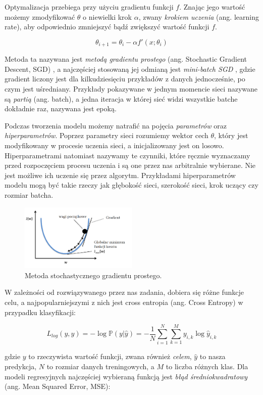 \documentclass[licencjacka]{pracamgr}
\begin{document}
Optymalizacja przebiega przy użyciu gradientu funkcji $ f $. Znając jego wartość możemy zmodyfikować $\theta$ o niewielki krok $ \alpha $, zwany \emph{krokiem uczenia} (ang. learning rate), aby odpowiednio zmniejszyć bądź zwiększyć wartość funkcji $ f $. 

$$ \theta_{i+1} = \theta_i - \alpha f'(x; \theta_i) $$

Metoda ta nazywana jest \emph{metodą gradientu prostego} (ang. Stochastic Gradient Descent, SGD) \cite{sgd}, a najczęściej stosowaną jej odmianą jest \emph{mini-batch SGD} \cite{mini-batch-sgd}, gdzie gradient liczony jest dla kilkudziesięciu przykładów z danych jednocześnie, po czym jest uśredniany. Przykłady pokazywane w jednym momencie sieci nazywane są \emph{partią} (ang. batch), a jedna iteracja w której sieć widzi wszystkie batche dokładnie raz, nazywana jest epoką.

Podczas tworzenia modelu możemy natrafić na pojęcia \emph{parametrów} oraz \emph{hiperparametrów}. Poprzez parametry sieci rozumiemy wektor cech $\theta$, który jest modyfikowany w procesie uczenia sieci, a inicjalizowany jest on losowo. Hiperparametrami natomiast nazywamy te czynniki, które ręcznie wyznaczamy przed rozpoczęciem procesu uczenia i są one przez nas arbitralnie wybierane. Nie jest możliwe ich uczenie się przez algorytm. Przykładami hiperparametrów modelu mogą być takie rzeczy jak głębokość sieci, szerokość sieci, krok uczący czy rozmiar batcha.

\begin{figure}[ht]
  \centering
  \includegraphics[width=0.5\textwidth]{sgd}
  \caption{Metoda stochastycznego gradientu prostego. \cite{sgd-img}}
\end{figure}

W zależności od rozwiązywanego przez nas zadania, dobiera się różne funkcje celu, a najpopularniejszymi z nich jest cross entropia (ang. Cross Entropy) w przypadku klasyfikacji:

$$ L_{log}(y, \hat{y}) = -\log\mathbb{P}(y | \hat{y}) = 
-\frac{1}{N} \sum_{i = 1}^N \sum_{k = 1}^M y_{i, k} \log \hat{y}_{i, k}
$$

gdzie $y$ to rzeczywista wartość funkcji, zwana również \emph{celem}, $\hat{y}$ to nasza predykcja, $N$ to rozmiar danych treningowych, a $M$ to liczba różnych klas. Dla modeli regresyjnych najczęściej wybieraną funkcją jest \emph{błąd średniokwadratowy} (ang. Mean Squared Error, MSE):
\end{document}
